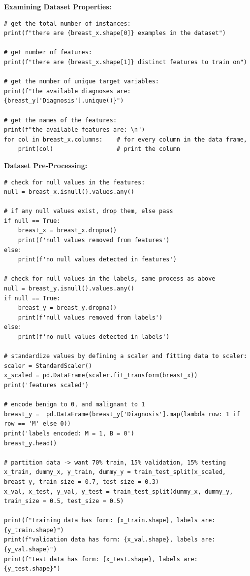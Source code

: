 \documentclass[a4paper]{article}
\begin{document}
\textbf{Examining Dataset Properties:}
\begin{lstlisting}[basicstyle= \scriptsize]
# get the total number of instances:
print(f"there are {breast_x.shape[0]} examples in the dataset")

# get number of features:
print(f"there are {breast_x.shape[1]} distinct features to train on")

# get the number of unique target variables:
print(f"the available diagnoses are: {breast_y['Diagnosis'].unique()}")

# get the names of the features:
print(f"the available features are: \n")
for col in breast_x.columns:    # for every column in the data frame, 
    print(col)                  # print the column    
\end{lstlisting}

\textbf{Dataset Pre-Processing:}
\begin{lstlisting}[basicstyle= \scriptsize]
# check for null values in the features:
null = breast_x.isnull().values.any()   

# if any null values exist, drop them, else pass
if null == True:
    breast_x = breast_x.dropna() 
    print(f'null values removed from features')
else:
    print(f'no null values detected in features')

# check for null values in the labels, same process as above
null = breast_y.isnull().values.any()
if null == True:
    breast_y = breast_y.dropna()
    print(f'null values removed from labels')
else:
    print(f'no null values detected in labels')
    
# standardize values by defining a scaler and fitting data to scaler:
scaler = StandardScaler()
x_scaled = pd.DataFrame(scaler.fit_transform(breast_x))
print('features scaled')

# encode benign to 0, and malignant to 1
breast_y =  pd.DataFrame(breast_y['Diagnosis'].map(lambda row: 1 if row == 'M' else 0))
print('labels encoded: M = 1, B = 0')
breast_y.head()

# partition data -> want 70% train, 15% validation, 15% testing
x_train, dummy_x, y_train, dummy_y = train_test_split(x_scaled, breast_y, train_size = 0.7, test_size = 0.3)
x_val, x_test, y_val, y_test = train_test_split(dummy_x, dummy_y, train_size = 0.5, test_size = 0.5)

print(f"training data has form: {x_train.shape}, labels are: {y_train.shape}")
print(f"validation data has form: {x_val.shape}, labels are: {y_val.shape}")
print(f"test data has form: {x_test.shape}, labels are: {y_test.shape}")
\end{lstlisting}
\end{document}

